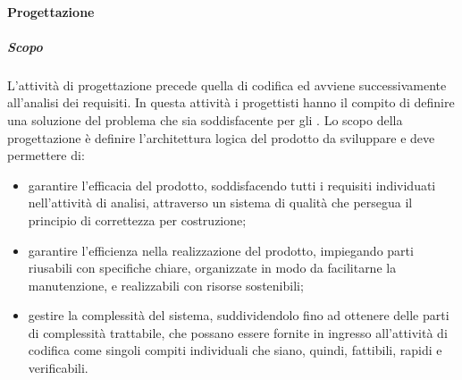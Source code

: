 			\paragraph {Progettazione}
				\subparagraph{Scopo}
					L'attività di progettazione precede quella di codifica ed avviene successivamente all'analisi dei requisiti.
					\newline
					In questa attività i progettisti hanno il compito di definire una soluzione del problema che sia soddisfacente per gli . 
					\newline
					Lo scopo della progettazione è definire l'architettura logica del prodotto da sviluppare e deve permettere di:
					\begin{itemize}
						\item garantire l'efficacia del prodotto, soddisfacendo tutti i requisiti individuati nell'attività di analisi, attraverso un sistema di qualità che persegua il principio di correttezza per costruzione;
						\item garantire l'efficienza nella realizzazione del prodotto, impiegando parti riusabili con specifiche chiare, organizzate in modo da facilitarne la manutenzione, e realizzabili con risorse sostenibili;
						\item gestire la complessità del sistema, suddividendolo fino ad ottenere delle parti di complessità trattabile, che possano essere fornite in ingresso all'attività di codifica come singoli compiti individuali che siano, quindi, fattibili, rapidi e verificabili.
					\end{itemize}
				
